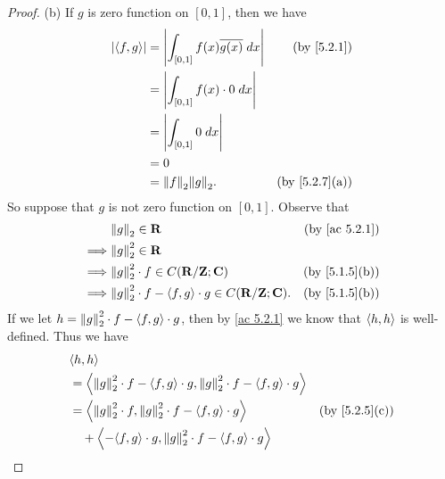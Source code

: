 \begin{proof}{(b)}
  If \(g\) is zero function on \([0, 1]\), then we have
  \begin{align*}
    \abs{\inner*{f, g}} & = \abs{\int_{[0, 1]} f(x) \overline{g(x)} \; dx} & \text{(by \cref{5.2.1})}    \\
                        & = \abs{\int_{[0, 1]} f(x) \cdot 0 \; dx}                                       \\
                        & = \abs{\int_{[0, 1]} 0 \; dx}                                                  \\
                        & = 0                                                                            \\
                        & = \norm*{f}_2 \norm*{g}_2.                       & \text{(by \cref{5.2.7}(a))}
  \end{align*}
  So suppose that \(g\) is not zero function on \([0, 1]\).
  Observe that
  \begin{align*}
             & \norm*{g}_2 \in \R                                                 & \text{(by \cref{ac 5.2.1})} \\
    \implies & \norm*{g}_2^2 \in \R                                                                             \\
    \implies & \norm*{g}_2^2 \cdot f \in C(\R / \Z ; \C)                          & \text{(by \cref{5.1.5}(b))} \\
    \implies & \norm*{g}_2^2 \cdot f - \inner*{f, g} \cdot g \in C(\R / \Z ; \C). & \text{(by \cref{5.1.5}(b))}
  \end{align*}
  If we let \(h = \norm*{g}_2^2 \cdot f - \inner*{f, g} \cdot g\), then by \cref{ac 5.2.1} we know that \(\inner*{h, h}\) is well-defined.
  Thus we have
  \begin{align*}
     & \inner*{h, h}                                                                                                                                          \\
     & = \inner*{\norm*{g}_2^2 \cdot f - \inner*{f, g} \cdot g, \norm*{g}_2^2 \cdot f - \inner*{f, g} \cdot g}                                                \\
     & = \inner*{\norm*{g}_2^2 \cdot f, \norm*{g}_2^2 \cdot f - \inner*{f, g} \cdot g}                                          & \text{(by \cref{5.2.5}(c))} \\
     & \quad + \inner*{-\inner*{f, g} \cdot g, \norm*{g}_2^2 \cdot f - \inner*{f, g} \cdot g}                                                                 \\

\end{align*}
\end{proof}

